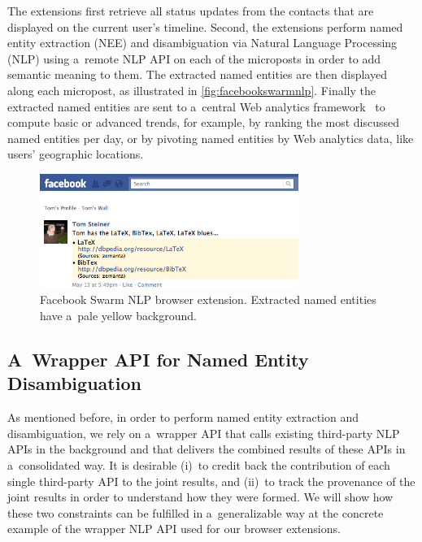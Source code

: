 The extensions first retrieve all status updates
from the contacts that are displayed
on the current user's timeline.
Second, the extensions perform named entity extraction (NEE)
and disambiguation via Natural Language Processing (NLP)
using a~remote NLP API on each of the microposts
in order to add semantic meaning to them.
The extracted named entities are then displayed
along each micropost, as illustrated in \autoref{fig:facebookswarmnlp}.
Finally the extracted named entities
are sent to a~central Web analytics framework~\cite{kaushik2009analytics}
to compute basic or advanced trends, for example,
by ranking the most discussed named entities per day,
or by pivoting named entities by Web analytics data,
like users' geographic locations.

\begin{figure}[!ht]
  \centering
  \includegraphics[width=0.75\textwidth]{facebook-swarm-nlp.png}
  \caption[Facebook Swarm NLP browser extension]
    {Facebook Swarm NLP browser extension.
    Extracted named entities have a~pale yellow background.}     
  \label{fig:facebookswarmnlp}
\end{figure}

\subsection{A~Wrapper API for Named Entity Disambiguation}
\label{sec:wrapperapi}

As mentioned before, in order to perform named entity extraction
and disambiguation, we rely on a~wrapper API
that calls existing third-party NLP APIs in the background
and that delivers the combined results of these APIs
in a~consolidated way.
It is  desirable
(i)~to credit back the contribution of each single third-party API
to the joint results, and
(ii)~to track the provenance of the joint results
in order to understand how they were formed.
We will show how these two constraints
can be fulfilled in a~generalizable way
at the concrete example of the wrapper NLP API
used for our browser extensions.

